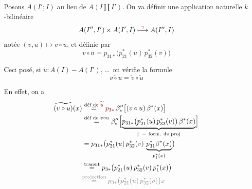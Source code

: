 
Posons $A(I';I)$ au lieu de $A(I\amalg I')$.
On va définir une application naturelle $k$-bilinéaire
\[
A(I'',I')\times A(I',I)\overset{\unsure{\gamma}}{\longmapsto}A(I'',I)
\]
notée $(v,u)\longmapsto v\circ u$, et définie par
\[
v\circ u=p_{31*}\bigl(p_{21}^*(u)\,p_{32}^*(v)\bigr)
\]

Ceci posé, si $\widetilde{u}:A(I)-A(I')$, \ldots\ on vérifie la formule
\[
\widetilde{v\circ u}=\widetilde v\circ\widetilde u
\]

En effet, on a
\[
\begin{aligned}
\widetilde{(v\circ u)}(x)
&\overset{\text{déf de }\widetilde{\deleted{\unsure{u}}}}{=}
\deleted{\unsure{p_{3*}}}\,
\beta''_*\bigl[(v\circ u)\,\beta^*(x)\bigr]\\
&\overset{\text{déf de }v\circ u}{=}
\beta''_*\Bigl[\underbrace{p_{31*}\bigl(p_{21}^*(u)\,p_{32}^*(v)\bigr)\,\beta^*(x)}
_{\Vert\ -\ \text{form. de proj}}\Bigr]\\
&=p_{31*}\bigl(p_{21}^*(u)\,p_{32}^*(v)\,
\underbrace{p_{31}^*\beta^*(x)}_{p_1^*(x)}\bigr)\\
&\overset{\text{transit}}{=}p_{3*}\bigl(p_{21}^*(u)\,p_{32}^*(v)\,p_1^*(x)\bigr)\\
&\deleted{\overset{\text{projection}}{=}p_{3*}\bigl(p_{21}^*(u)\,p_{32}^*(\unsure{v})\bigr)x}
\end{aligned}
\]

